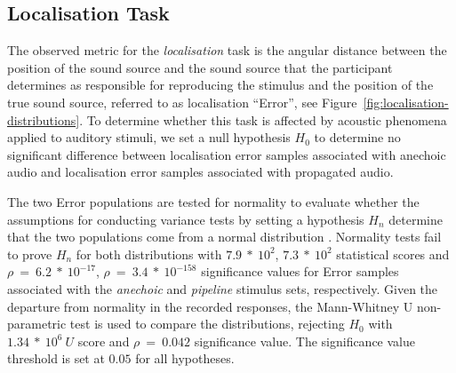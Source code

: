 \subsection{Localisation Task}\label{sec:localisation-results}
The observed metric for the \emph{localisation} task is the angular distance between the position of the sound source and the sound source that the participant determines as responsible for reproducing the stimulus and the position of the true sound source, referred to as localisation ``Error'', see Figure~\ref{fig:localisation-distributions}. To determine whether this task is affected by acoustic phenomena applied to auditory stimuli, we set a null hypothesis $H_0$ to determine no significant difference between localisation error samples associated with anechoic audio and localisation error samples associated with propagated audio. \par
The two Error populations are tested for normality to evaluate whether the assumptions for conducting variance tests by setting a hypothesis $H_n$ determine that the two populations come from a normal distribution \citep{pearson1977tests}. Normality tests fail to prove $H_n$ for both distributions with $7.9\ *\ 10^2$, $7.3\ *\ 10^2$ statistical scores and $\rho\ =\ 6.2\ *\ 10^{-17}$, $\rho\ =\ 3.4\ *\ 10^{-158}$ significance values for Error samples associated with the \emph{anechoic} and \emph{pipeline} stimulus sets, respectively. Given the departure from normality in the recorded responses, the Mann-Whitney U non-parametric test is used to compare the distributions, rejecting $H_0$ with $1.34\ *\ 10^6\ U$ score and $\rho\ =\ 0.042$ significance value. The significance value threshold is set at $0.05$ for all hypotheses. \par

